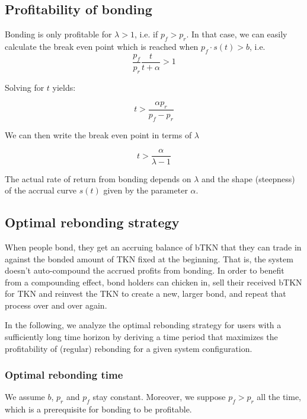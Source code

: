 \documentclass{article}
\begin{document}
\subsection{Profitability of bonding}
Bonding is only profitable for $\lambda>1$, i.e. if $p_f>p_r$. In that case, we can easily calculate the break even point which is reached when $p_f \cdot s(t)>b$, i.e.
\begin{equation}
  \label{eq:break_even_0}
\frac{p_f}{p_r}\frac{t}{t+\alpha} > 1
\end{equation}

Solving for $t$ yields:

\begin{equation}
  \label{eq:break_even_1}
t > \frac{\alpha p_r}{p_f-p_r}
\end{equation}

We can then write the break even point in terms of $\lambda$

\begin{equation}
  \label{eq:break_even_2}
t > \frac{\alpha}{\lambda-1}
\end{equation}

The actual rate of return from bonding depends on $\lambda$ and the shape (steepness) of the accrual curve $s(t)$ given by the parameter $\alpha$.

\subsection{Optimal rebonding strategy}
  \label{sec:rebonding_strategy}
When people bond, they get an accruing balance of bTKN that they can trade in against the bonded amount of TKN fixed at the beginning. That is, the system doesn't auto-compound the accrued profits from bonding. In order to benefit from a compounding effect, bond holders can chicken in, sell their received bTKN for TKN and reinvest the TKN to create a new, larger bond, and repeat that process over and over again.

In the following, we analyze the optimal rebonding strategy for users with a sufficiently long time horizon by deriving a time period that maximizes the profitability of (regular) rebonding for a given system configuration.

\subsubsection{Optimal rebonding time}
  \label{sec:T_OP}
We assume $b$, $p_r$ and $p_f$ stay constant. Moreover, we suppose $p_f>p_r$ all the time, which is a prerequisite for bonding to be profitable. 
\end{document}
